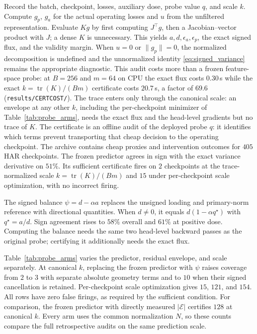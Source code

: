 \documentclass{article}
\begin{document}
Record the batch, checkpoint, losses, auxiliary dose, probe value $q$, and scale $k$.
Compute $g_p$, $g_a$ for the actual operating losses and $u$ from the unfiltered
representation. Evaluate $K g$ by first computing $J^\top g$, then a Jacobian--vector
product with $J$; a dense $K$ is unnecessary. This yields $a,d,\epsilon_a,\epsilon_p$,
the exact signed flux, and the validity margin. When $u=0$ or $\|g_p\|=0$, the
normalized decomposition is undefined and the unnormalized identity
\eqref{eq:signed_variance} remains the appropriate diagnostic.
This audit costs more than a frozen feature-space probe: at $B=256$ and $m=64$ on
CPU the exact flux costs $0.30$\,s while the exact $k=\operatorname{tr}(K)/(Bm)$
certificate costs $20.7$\,s, a factor of $69.6$
(\texttt{results/CERTCOST/}). The trace enters only through the canonical scale:
an envelope at any other $k$, including the per-checkpoint minimizer of
Table~\ref{tab:probe_arms}, needs the exact flux and the head-level gradients but
no trace of $K$. The certificate is an offline audit of the deployed probe $q$: it identifies
which terms prevent transporting that cheap decision to the operating checkpoint.
The archive contains cheap proxies and intervention outcomes for $405$ HAR checkpoints. The frozen predictor agrees in sign with the exact variance derivative on $51\%$. Its sufficient certificate fires on $2$ checkpoints at the trace-normalized scale $k=\operatorname{tr}(K)/(Bm)$ and $15$ under per-checkpoint scale optimization, with no incorrect firing.

The signed balance $\psi=d-\alpha a$ replaces the unsigned loading and primary-norm reference with directional quantities. When $d\ne0$, it equals $d(1-\alpha q^\star)$ with $q^\star=a/d$. Sign agreement rises to $58\%$ overall and $61\%$ at positive dose. Computing the balance needs the same two head-level backward passes as the original probe; certifying it additionally needs the exact flux.

Table~\ref{tab:probe_arms} varies the predictor, residual envelope, and scale separately. At canonical $k$, replacing the frozen predictor with $\psi$ raises coverage from $2$ to $3$ with separate absolute geometry terms and to $10$ when their signed cancellation is retained. Per-checkpoint scale optimization gives $15$, $121$, and $154$. All rows have zero false firings, as required by the sufficient condition. For comparison, the frozen predictor with directly measured $|\mathcal E|$ certifies $128$ at canonical $k$. Every arm uses the common normalization $N$, so these counts compare the full retrospective audits on the same prediction scale.
\end{document}
